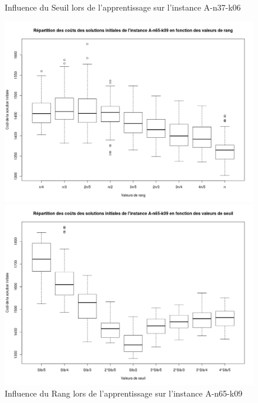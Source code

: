 \documentclass[a4paper,11pt]{article}%
\begin{document}
\begin{figure}
\begin{minipage}[c]{.46\linewidth}
        \caption{Influence du Seuil lors de l'apprentissage sur l'instance A-n37-k06}
        \label{InfSA3706}
    \end{minipage}
    
    \begin{minipage}[c]{.46\linewidth}
        \centering
        \includegraphics[scale=0.25]{InfluenceRangA6509}
        
        \caption{Influence du Rang lors de l'apprentissage sur l'instance A-n65-k09}
        \label{InfRA6509}
    \end{minipage}
    \hfill%
    \begin{minipage}[c]{.46\linewidth}
        \centering
        \includegraphics[scale=0.25]{InfluenceSeuilA6509}
        

\end{minipage}
\end{figure}
\end{document}
